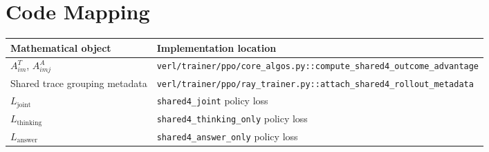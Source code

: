 \documentclass[11pt]{article}
\begin{document}
\section{Code Mapping}

\begin{center}
\begin{tabular}{ll}
\toprule
Mathematical object & Implementation location \\
\midrule
\(A^T_{im}\), \(A^A_{imj}\) &
\texttt{verl/trainer/ppo/core\_algos.py::compute\_shared4\_outcome\_advantage} \\
Shared trace grouping metadata &
\texttt{verl/trainer/ppo/ray\_trainer.py::attach\_shared4\_rollout\_metadata} \\
\(L_{\mathrm{joint}}\) &
\texttt{shared4\_joint} policy loss \\
\(L_{\mathrm{thinking}}\) &
\texttt{shared4\_thinking\_only} policy loss \\
\(L_{\mathrm{answer}}\) &
\texttt{shared4\_answer\_only} policy loss \\
\bottomrule
\end{tabular}
\end{center}
\end{document}
